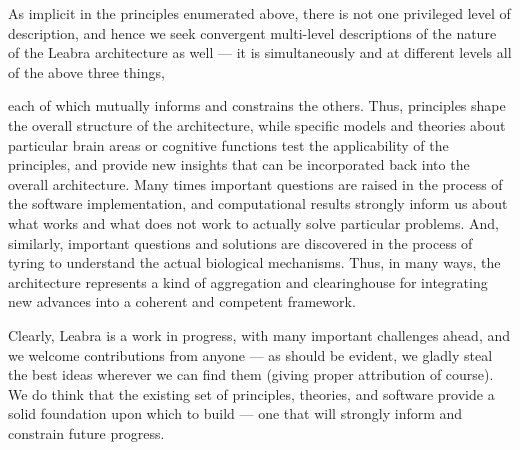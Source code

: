 \documentclass[11pt,twoside]{article}
\begin{document}
As implicit in the principles enumerated above, there is not one
privileged level of description, and hence we seek convergent
multi-level descriptions of the nature of the Leabra architecture as
well --- it is simultaneously and at different levels all of the above
three things,

each of which mutually informs and constrains the others.  Thus,
principles shape the overall structure of the architecture, while
specific models and theories about particular brain areas or cognitive
functions test the applicability of the principles, and provide new
insights that can be incorporated back into the overall architecture.
Many times important questions are raised in the process of the
software implementation, and computational results strongly inform us
about what works and what does not work to actually solve particular
problems.  And, similarly, important questions and solutions are
discovered in the process of tyring to understand the actual
biological mechanisms. Thus, in many ways, the architecture represents
a kind of aggregation and clearinghouse for integrating new advances
into a coherent and competent framework.

Clearly, Leabra is a work in progress, with many important challenges
ahead, and we welcome contributions from anyone --- as should be
evident, we gladly steal the best ideas wherever we can find them
(giving proper attribution of course).  We do think that the existing
set of principles, theories, and software provide a solid foundation
upon which to build --- one that will strongly inform and constrain
future progress.




\end{document}
